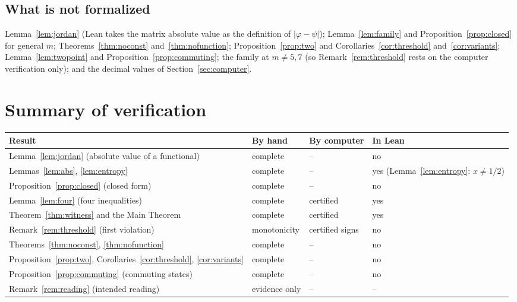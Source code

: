 \documentclass[11pt]{amsart}
\theoremstyle{definition}\newtheorem{definition}[theorem]{Definition}
\theoremstyle{remark}\newtheorem{remark}[theorem]{Remark}
\newcommand{\abs}[1]{\lvert #1\rvert}
\begin{document}
\subsection{What is not formalized}
Lemma~\ref{lem:jordan} (Lean takes the matrix absolute value as the definition of \(\abs{\varphi-\psi}\)); Lemma~\ref{lem:family} and Proposition~\ref{prop:closed} for general \(m\); Theorems~\ref{thm:noconst} and~\ref{thm:nofunction}; Proposition~\ref{prop:two} and Corollaries~\ref{cor:threshold} and~\ref{cor:variants}; Lemma~\ref{lem:twopoint} and Proposition~\ref{prop:commuting}; the family at \(m\ne5,7\) (so Remark~\ref{rem:threshold} rests on the computer verification only); and the decimal values of Section~\ref{sec:computer}.

\section{Summary of verification}\label{sec:summary}

\begin{center}
\small
\begin{tabular}{L{0.34\textwidth}L{0.16\textwidth}L{0.16\textwidth}L{0.16\textwidth}}
\toprule
Result & By hand & By computer & In Lean \\
\midrule
Lemma~\ref{lem:jordan} (absolute value of a functional) & complete & -- & no \\
Lemmas~\ref{lem:abs}, \ref{lem:entropy} & complete & -- & yes (Lemma~\ref{lem:entropy}: \(x\ne1/2\)) \\
Proposition~\ref{prop:closed} (closed form) & complete & -- & no \\
Lemma~\ref{lem:four} (four inequalities) & complete & certified & yes \\
Theorem~\ref{thm:witness} and the Main Theorem & complete & certified & yes \\
Remark~\ref{rem:threshold} (first violation) & monotonicity & certified signs & no \\
Theorems~\ref{thm:noconst}, \ref{thm:nofunction} & complete & -- & no \\
Proposition~\ref{prop:two}, Corollaries~\ref{cor:threshold}, \ref{cor:variants} & complete & -- & no \\
Proposition~\ref{prop:commuting} (commuting states) & complete & -- & no \\
Remark~\ref{rem:reading} (intended reading) & evidence only & -- & -- \\
\bottomrule
\end{tabular}
\end{center}
\end{document}

